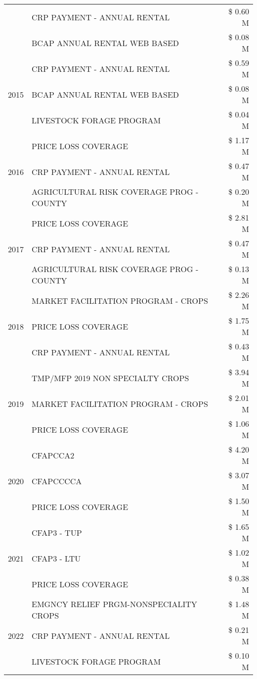 \begin{tabular}{llr}
 & CRP PAYMENT - ANNUAL RENTAL & \$ 0.60 M \\
 & BCAP ANNUAL RENTAL WEB BASED & \$ 0.08 M \\
\cline{1-3}
\multirow[t]{3}{*}{2015} & CRP PAYMENT - ANNUAL RENTAL & \$ 0.59 M \\
 & BCAP ANNUAL RENTAL WEB BASED & \$ 0.08 M \\
 & LIVESTOCK FORAGE PROGRAM & \$ 0.04 M \\
\cline{1-3}
\multirow[t]{3}{*}{2016} & PRICE LOSS COVERAGE & \$ 1.17 M \\
 & CRP PAYMENT - ANNUAL RENTAL & \$ 0.47 M \\
 & AGRICULTURAL RISK COVERAGE PROG - COUNTY & \$ 0.20 M \\
\cline{1-3}
\multirow[t]{3}{*}{2017} & PRICE LOSS COVERAGE & \$ 2.81 M \\
 & CRP PAYMENT - ANNUAL RENTAL & \$ 0.47 M \\
 & AGRICULTURAL RISK COVERAGE PROG - COUNTY & \$ 0.13 M \\
\cline{1-3}
\multirow[t]{3}{*}{2018} & MARKET FACILITATION PROGRAM - CROPS & \$ 2.26 M \\
 & PRICE LOSS COVERAGE & \$ 1.75 M \\
 & CRP PAYMENT - ANNUAL RENTAL & \$ 0.43 M \\
\cline{1-3}
\multirow[t]{3}{*}{2019} & TMP/MFP 2019 NON SPECIALTY CROPS & \$ 3.94 M \\
 & MARKET FACILITATION PROGRAM - CROPS & \$ 2.01 M \\
 & PRICE LOSS COVERAGE & \$ 1.06 M \\
\cline{1-3}
\multirow[t]{3}{*}{2020} & CFAPCCA2 & \$ 4.20 M \\
 & CFAPCCCCA & \$ 3.07 M \\
 & PRICE LOSS COVERAGE & \$ 1.50 M \\
\cline{1-3}
\multirow[t]{3}{*}{2021} & CFAP3 - TUP & \$ 1.65 M \\
 & CFAP3 - LTU & \$ 1.02 M \\
 & PRICE LOSS COVERAGE & \$ 0.38 M \\
\cline{1-3}
\multirow[t]{3}{*}{2022} & EMGNCY RELIEF PRGM-NONSPECIALITY CROPS & \$ 1.48 M \\
 & CRP PAYMENT - ANNUAL RENTAL & \$ 0.21 M \\
 & LIVESTOCK FORAGE PROGRAM & \$ 0.10 M \\
\cline{1-3}
\bottomrule
\end{tabular}
